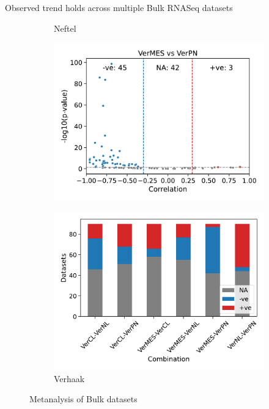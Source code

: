\documentclass[aspectratio=169,9pt]{beamer}
\begin{document}
\begin{frame}{Observed trend holds across multiple Bulk RNASeq datasets}
\begin{adjustwidth}{-5cm}{-5cm}
\begin{figure}
\begin{subfigure}[c]{0.33\textwidth}
                    \caption{Neftel}
                \end{subfigure}
                \pause
                \begin{subfigure}[c]{0.22\textwidth}
                    \centering
                    \includegraphics[width=\textwidth]{Volcano_Bulk_VerMES-VerPN}
                \end{subfigure}
                \begin{subfigure}[c]{0.33\textwidth}
                    \centering
                    \includegraphics[width=\textwidth]{Bar_Bulk_Ver}
                    \caption{Verhaak}
                \end{subfigure}
                \pause[1]\caption{Metanalysis of Bulk datasets}
            \end{figure}
        \end{adjustwidth}
    \end{frame}
\end{document}

